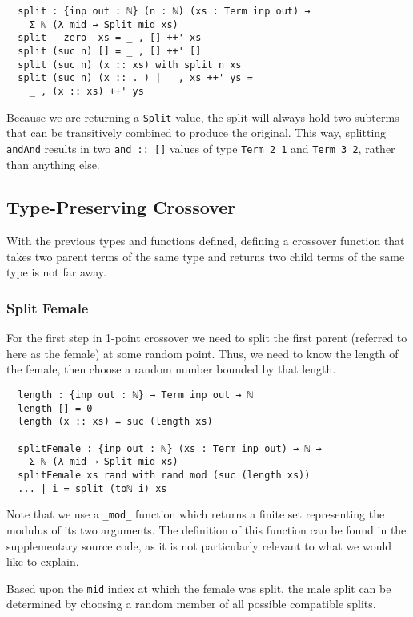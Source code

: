 \documentclass[runningheads,a4paper]{llncs}
\begin{document}
\begin{verbatim}
  split : {inp out : ℕ} (n : ℕ) (xs : Term inp out) →
    Σ ℕ (λ mid → Split mid xs)
  split   zero  xs = _ , [] ++' xs
  split (suc n) [] = _ , [] ++' []
  split (suc n) (x :: xs) with split n xs
  split (suc n) (x :: ._) | _ , xs ++' ys =
    _ , (x :: xs) ++' ys
\end{verbatim}

Because we are returning a \texttt{Split} value, the split will always
hold two subterms that can be transitively combined to produce the
original. This way, splitting \texttt{andAnd} results in two
\texttt{and :: []} values of type \texttt{Term 2 1} and
\texttt{Term 3 2}, rather than anything else.

\subsection{Type-Preserving Crossover}

With the previous types and functions defined, defining a
crossover function that takes two parent terms of the same type and
returns two child terms of the same type is not far away.

\subsubsection{Split Female}

For the first step in 1-point crossover we need to split the first
parent (referred to here as the female) at some random point. Thus, we
need to know the length of the female, then choose a random number
bounded by that length.

\begin{verbatim}
  length : {inp out : ℕ} → Term inp out → ℕ
  length [] = 0
  length (x :: xs) = suc (length xs)

  splitFemale : {inp out : ℕ} (xs : Term inp out) → ℕ →
    Σ ℕ (λ mid → Split mid xs)
  splitFemale xs rand with rand mod (suc (length xs))
  ... | i = split (toℕ i) xs
\end{verbatim}

Note that we use a \texttt{\_mod\_} function which returns a finite set
representing the modulus of its two arguments. The definition of this
function can be found in the supplementary source code, as it is not
particularly relevant to what we would like to explain.

Based upon the \texttt{mid} index at which the female was split, the
male split can be determined by choosing a random member of all
possible compatible splits.
\end{document}

